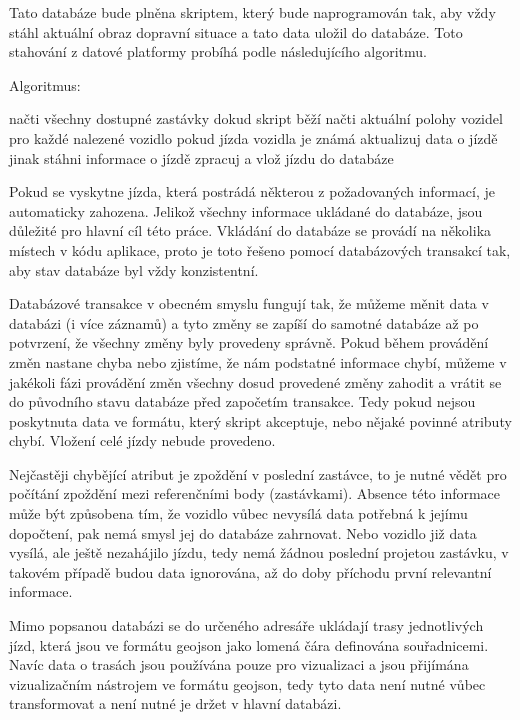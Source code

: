 Tato databáze bude plněna skriptem, který bude naprogramován tak, aby vždy stáhl aktuální obraz dopravní situace a tato data uložil do databáze. Toto stahování z datové platformy probíhá podle následujícího algoritmu.


\bigbreak


Algoritmus:
\begin{code}[frame=none]
načti všechny dostupné zastávky
dokud skript běží
  načti aktuální polohy vozidel
  pro každé nalezené vozidlo
  pokud jízda vozidla je známá
    aktualizuj data o jízdě
  jinak
    stáhni informace o jízdě
    zpracuj a vlož jízdu do databáze
\end{code}


\bigbreak


Pokud se vyskytne jízda, která postrádá některou z požadovaných informací, je automaticky zahozena. Jelikož všechny informace ukládané do databáze, jsou důležité pro hlavní cíl této práce. Vkládání do databáze se provádí na několika místech v kódu aplikace, proto je toto řešeno pomocí databázových transakcí tak, aby stav databáze byl vždy konzistentní.


\bigbreak


Databázové transakce v obecném smyslu fungují tak, že můžeme měnit data v databázi (i více záznamů) a tyto změny se zapíší do samotné databáze až po potvrzení, že všechny změny byly provedeny správně. Pokud během provádění změn nastane chyba nebo zjistíme, že nám podstatné informace chybí, můžeme v jakékoli fázi provádění změn všechny dosud provedené změny zahodit a vrátit se do původního stavu databáze před započetím transakce.  Tedy pokud nejsou poskytnuta data ve formátu, který skript akceptuje, nebo nějaké povinné atributy chybí. Vložení celé jízdy nebude provedeno.


\bigbreak


Nejčastěji chybějící atribut je zpoždění v poslední zastávce, to je nutné vědět pro počítání zpoždění mezi referenčními body (zastávkami). Absence této informace může být způsobena tím, že vozidlo vůbec nevysílá data potřebná k jejímu dopočtení, pak nemá smysl jej do databáze zahrnovat. Nebo vozidlo již data vysílá, ale ještě nezahájilo jízdu, tedy nemá žádnou poslední projetou zastávku, v takovém případě budou data ignorována, až do doby příchodu první relevantní informace.


\bigbreak


Mimo popsanou databázi se do určeného adresáře ukládají trasy jednotlivých jízd, která jsou ve formátu \gls{geojson} jako lomená čára definována souřadnicemi. Navíc data o trasách jsou používána pouze pro vizualizaci a jsou přijímána vizualizačním nástrojem ve formátu \gls{geojson}, tedy tyto data není nutné vůbec transformovat a není nutné je držet v hlavní databázi.


